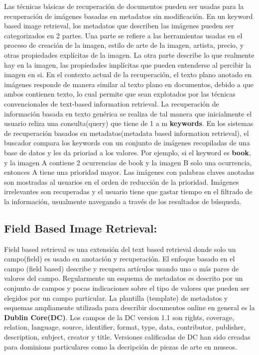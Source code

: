 \documentclass{llncs}
\begin{document}
Las t\'ecnicas b\'asicas de recuperaci\'on de documentos pueden ser usadas para la recuperaci\'on
de im\'agenes basadas en metadatos sin modificaci\'on. En un keyword based image
retrieval, los metadatos que describen las im\'agenes pueden ser categorizados en 2
partes. Una parte se refiere a las herramientas usadas en el proceso de creaci\'on de la imagen, estilo
de arte de la imagen, artista, precio, y otras propiedades expl\'icitas de la imagen. La otra parte describe
lo que realmente hay en la imagen, las propiedades impl\'icitas que pueden entenderse al 
percibir la imagen en si. En el contexto actual de la recuperaci\'on, el texto plano anotado en im\'agenes
responde de manera similar al texto plano en documentos, debido a que ambos contienen texto, lo cual permite
que sean explotados por las t\'ecnicas convencionales de text-based information retrieval. La recuperaci\'on de
informaci\'on basada en texto gen\'erica se realiza de tal manera que inicialmente el usuario reliza una
consulta(query) que tiene de 1 a m \textbf{keywords}. En los sistemas de recuperaci\'on basados en 
metadatos(metadata based information retrieval), el buscador compara los keywords con un conjunto de im\'agenes 
recopiladas de una base de datos y les da prioriad a los valores. Por ejemplo, si el keyword es \textbf{book}, y la 
imagen A contiene 2 ocurrencias de book y la imagen B solo una ocurrencia, entonces A tiene una prioridad mayor.  Las 
im\'agenes con palabras claves anotadas son mostradas al usuarios en el orden de reducci\'on de la prioridad. Im\'agenes 
irrelevantes son recuperadas y el usuario tiene que gastar tiempo en el filtrado de la informaci\'on, usualmente navegando
a trav\'es de los resultados de b\'usqueda. 

\subsection{Field Based Image Retrieval:}
Field based retrieval es una extensi\'on del text based retrieval donde solo un campo(field) es usado en anotaci\'on 
y recuperaci\'on. El enfoque basado en el campo (field based) describe y recupera art\'iculos usando uno o m\'as pares de valores 
del campo. Regularmente un esquema de metadatos es descrito por un conjunto de campos y pocas indicaciones sobre el tipo de
valores que pueden ser elegidos por un campo  particular. La plantilla (template) de metadatos y esquemas ampliamente utilizada para 
describir documentos online en general es la \textbf{Dublin Core(DC)}. Los campos de la DC version 1.1 son rights, coverage, relation,
language, source, identifier, format, type, data, contributor, publisher, description, subject, creator y title.  Versiones calificadas de 
DC han sido creadas para dominions particulares como la decripci\'on de piezas de arte en museos.
\end{document}
